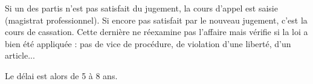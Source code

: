 	Si un des partis n’est pas satisfait du jugement, la cours d’appel est saisie (magistrat professionnel).
	Si encore pas satisfait par le nouveau jugement, c'est la cours de cassation.
	Cette dernière ne réexamine pas l'affaire mais vérifie si la loi a bien été appliquée : pas de vice de procédure, de violation d'une liberté, d'un article...
	
	Le délai est alors de 5 à 8 ans.
